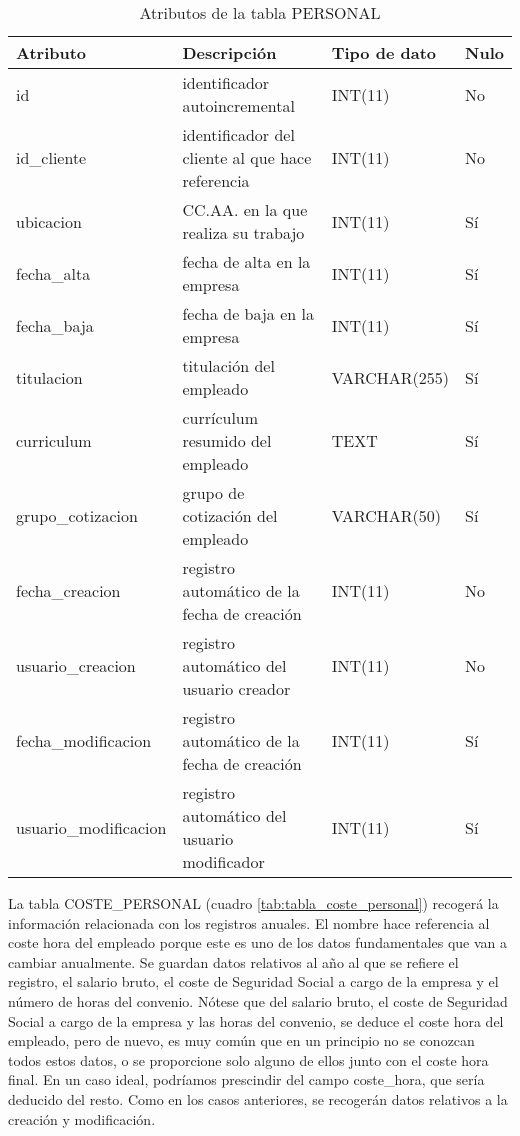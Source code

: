 \begin{table}
\small
\centering
\begin{tabular}{|l|p{2in}|l|l|}\hline
\textbf{Atributo} & \textbf{Descripción} & \textbf{Tipo de dato} &
\textbf{Nulo} \\\hline\hline
id & identificador autoincremental & INT(11) & No\\\hline
id\_cliente & identificador del cliente al que hace referencia & INT(11) &
No\\\hline
ubicacion & CC.AA. en la que realiza su trabajo & INT(11) & Sí\\\hline
fecha\_alta & fecha de alta en la empresa & INT(11) & Sí\\\hline
fecha\_baja & fecha de baja en la empresa & INT(11) & Sí\\\hline
titulacion & titulación del empleado & VARCHAR(255) & Sí\\\hline
curriculum & currículum resumido del empleado & TEXT & Sí\\\hline
grupo\_cotizacion & grupo de cotización del empleado & VARCHAR(50) & Sí\\\hline
fecha\_creacion & registro automático de la fecha de creación & INT(11) &
No\\\hline
usuario\_creacion & registro automático del usuario creador & INT(11) &
No\\\hline
fecha\_modificacion & registro automático de la fecha de creación & INT(11) &
Sí\\\hline
usuario\_modificacion & registro automático del usuario modificador & INT(11) &
Sí\\\hline
\end{tabular}
\caption{Atributos de la tabla PERSONAL}
\label{tab:tabla_personal}
\end{table}

La tabla COSTE\_PERSONAL (cuadro \ref{tab:tabla_coste_personal}) recogerá la
información relacionada con los registros anuales. El nombre hace referencia al
coste hora del empleado porque este es uno de los datos fundamentales que van a
cambiar anualmente. Se guardan datos relativos al año al que se refiere el
registro, el salario bruto, el coste de Seguridad Social a cargo de la empresa
y el número de horas del convenio. Nótese que del salario bruto, el coste de
Seguridad Social a cargo de la empresa y las horas del convenio, se deduce el
coste hora del empleado, pero de nuevo, es muy común que en un principio no se
conozcan todos estos datos, o se proporcione solo alguno de ellos junto con el
coste hora final. En un caso ideal, podríamos prescindir del campo coste\_hora,
que sería deducido del resto. Como en los casos anteriores, se recogerán datos
relativos a la creación y modificación.

